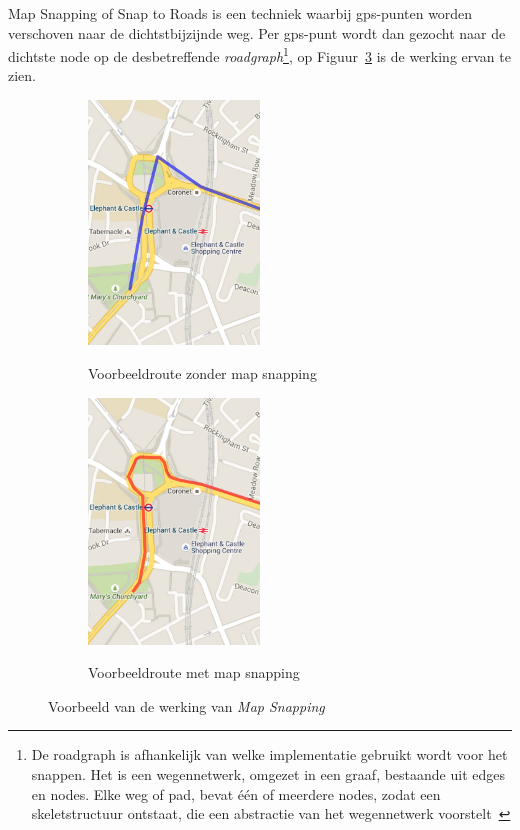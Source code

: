 Map Snapping of Snap to Roads is een techniek waarbij \ac{gps}-punten worden
verschoven naar de dichtstbijzijnde weg. Per \ac{gps}-punt wordt dan gezocht
naar de dichtste node op de desbetreffende \textit{roadgraph}\footnote{De
    roadgraph is afhankelijk van welke implementatie gebruikt wordt voor het
    snappen. Het is een wegennetwerk, omgezet in een graaf, bestaande uit edges en
    nodes. Elke weg of pad, bevat één of meerdere nodes, zodat een skeletstructuur
    ontstaat, die een abstractie van het wegennetwerk
    voorstelt~\cite{seiler2022haul}}, op Figuur~\ref{fig:MapSnapping} is de werking
ervan te zien\cite{Snapping96:online}.
\begin{figure}[h]
    \centering
    \begin{subfigure}[b]{.5\textwidth}
        \centering
        \caption{Voorbeeldroute zonder map snapping}
        \includegraphics[width=0.5\textwidth]{fig/Map Snapping/before.png}\label{fig:before_MapSnapping}
    \end{subfigure}\hfill
    \begin{subfigure}[b]{.5\textwidth}
        \centering
        \caption{Voorbeeldroute met map snapping}
        \includegraphics[width=0.5\textwidth]{fig/Map Snapping/after.png}\label{fig:after_MapSnapping}
    \end{subfigure}
    \caption{Voorbeeld van de werking van \textit{Map Snapping}}\label{fig:MapSnapping}
\end{figure}

